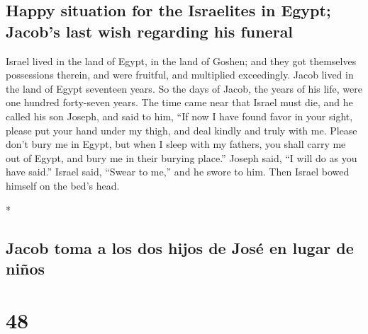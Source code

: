 \begin{paracol}{2}
\begin{otherlanguage}{english}
\hypertarget{happy-situation-for-the-israelites-in-egypt-jacobs-last-wish-regarding-his-funeral}{%
\subsection{Happy situation for the Israelites in Egypt; Jacob's last
wish regarding his
funeral}\label{happy-situation-for-the-israelites-in-egypt-jacobs-last-wish-regarding-his-funeral}}

 Israel lived in the land of Egypt, in the land of
Goshen; and they got themselves possessions therein, and were fruitful,
and multiplied exceedingly.  Jacob lived in the land of
Egypt seventeen years. So the days of Jacob, the years of his life, were
one hundred forty-seven years.  The time came near that
Israel must die, and he called his son Joseph, and said to him, ``If now
I have found favor in your sight, please put your hand under my thigh,
and deal kindly and truly with me. Please don't bury me in Egypt,
 but when I sleep with my fathers, you shall carry me out
of Egypt, and bury me in their burying place.'' Joseph said, ``I will do
as you have said.''  Israel said, ``Swear to me,'' and he
swore to him. Then Israel bowed himself on the bed's head.

\end{otherlanguage}

\switchcolumn[0]*

\hypertarget{jacob-toma-a-los-dos-hijos-de-josuxe9-en-lugar-de-niuxf1os}{%
\subsection{Jacob toma a los dos hijos de José en lugar de
niños}\label{jacob-toma-a-los-dos-hijos-de-josuxe9-en-lugar-de-niuxf1os}}

\hypertarget{section-94}{%
\section{48}\label{section-94}}


\end{paracol}
